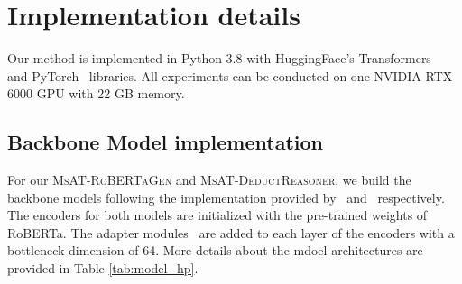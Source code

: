 \documentclass[11pt]{article}
\newcommand{\ba}{}
\begin{document}
\section{Implementation details}\label{app:implement}
Our method is implemented in Python 3.8 with HuggingFace's Transformers~\cite{wolf2020hf} and PyTorch~\cite{paszke2019pytorch} libraries.
All experiments can be conducted on one NVIDIA RTX 6000 GPU with 22 GB memory.
    

\subsection{Backbone Model implementation}

    For our \textsc{MsAT-RoBERTaGen} and \textsc{MsAT-DeductReasoner},
      we build the backbone models following the implementation provided by~\citet{lan2021mwptoolkit} and~\citet{jie2022deductreason} respectively.
The encoders for both models are initialized with the pre-trained weights of RoBERTa\ba.
The adapter modules~\cite{houlsby2019adapter} are added to each layer of the encoders with a bottleneck dimension of 64.
More details about the mdoel architectures are provided in Table \ref{tab:model_hp}.


\begin{table}[h]
    \begin{center}
    \centering
    \caption{
        \label{tab:model_hp}
        Hyperparameters of model architectures.
    }
    \end{center}
\end{table}
\end{document}

